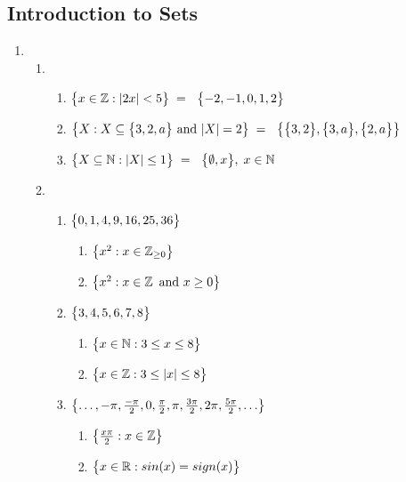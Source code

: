 \subsection*{Introduction to Sets}
\begin{enumerate}
    \item
    \begin{enumerate}[label=(\alph*), itemsep=16pt]
        \item 
        \begin{enumerate}[label=(\roman*), itemsep=10pt]
            \item $
                \bigl\{ { x \in \operatorname{\mathbb{Z}}: \lvert {2x} \rvert < 5 } \bigr\} \;=\; \
                \bigl\{ { -2, -1, 0, 1, 2 } \bigr\} 
            $
            \item $
                \bigl\{ { X : X \subseteq \bigl\{ {3,2,a} \bigr\} \text{ and } \lvert {X} \rvert = 2 } \bigr\} \;=\; \
                \bigl\{ { \bigl\{ { 3,2 } \bigr\}, \bigl\{ { 3,a } \bigr\}, \bigl\{ { 2,a } \bigr\} } \bigr\}
            $
            \item $
                \bigl\{ { X \subseteq \operatorname{\mathbb{N}} : \lvert {X} \rvert \leq 1 } \bigr\} \;=\; \
                \bigl\{ { \emptyset, x } \bigr\},\; x \in \operatorname{\mathbb{N}}
            $
        \end{enumerate}

        \item
        \begin{enumerate}[label=(\roman*), itemsep=10pt]
            \item $\bigl\{ {0, 1, 4, 9, 16, 25, 36} \bigr\}$ \vspace*{0.2cm}
            \begin{enumerate}[label=(\arabic*)]
                \item $\bigl\{ { x^2 : x \in \operatorname{\mathbb{Z}}_{\geq 0} } \bigr\}$
                \item $\bigl\{ { x^2 : x \in \operatorname{\mathbb{Z}} \text{ and } x \geq 0 } \bigr\}$
            \end{enumerate}
            \item $\bigl\{ {3, 4, 5, 6, 7, 8} \bigr\}$ \vspace*{0.2cm}
            \begin{enumerate}[label=(\arabic*)]
                \item $\bigl\{ { x \in \operatorname{\mathbb{N}} : 3 \leq x \leq 8 } \bigr\}$
                \item $\bigl\{ { x \in \operatorname{\mathbb{Z}} : 3 \leq \lvert {x} \rvert \leq 8 } \bigr\}$
            \end{enumerate}
            \item $\bigl\{ {\ldots, -\pi, \frac{-\pi}{2}, 0, \frac{\pi}{2}, \pi, \frac{3\pi}{2}, 2\pi, \frac{5\pi}{2}, \ldots} \bigr\}$ \vspace*{0.2cm}
            \begin{enumerate}[label=(\arabic*)]
                \item $\bigl\{ { \frac{x\pi}{2} : x \in \operatorname{\mathbb{Z}} } \bigr\}$
                \item $\bigl\{ { x \in \mathbb{R} : sin(x) = sign(x)} \bigr\}$
            \end{enumerate}
        \end{enumerate}
    \end{enumerate}


\end{enumerate}
